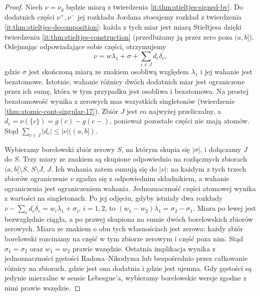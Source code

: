 \begin{proof}
Niech $\nu=\nu_g$ będzie miarą z twierdzenia
\ref{it:thm:stieltjes-signed-bv}. Do dodatnich części
$\nu^+,\nu^-$ jej rozkładu Jordana stosujemy rozkład
z twierdzenia \ref{it:thm:stieltjes-decomposition}:
każda z tych miar jest miarą Stieltjesa dzięki twierdzeniu
\ref{it:thm:stieltjes-construction} (przedłużamy ją przez
zero poza $(a,b]$). Odejmując odpowiadające sobie części,
otrzymujemy
\[
 \nu=w\lambda_1+\sigma+\sum_{c\in J}d_c\delta_c,
\]
gdzie $\sigma$ jest skończoną miarą ze znakiem osobliwą
względem $\lambda_1$ i jej wahanie jest bezatomowe.
Istotnie, wahanie różnicy dwóch dodatnich miar jest
ograniczone przez ich sumę, która w tym przypadku
jest osobliwa i bezatomowa. Na prostej bezatomowość
wynika z zerowych mas wszystkich singletonów
(twierdzenie \ref{thm:atomic-cont-singular-17}).
Zbiór $J$ jest co najwyżej przeliczalny, a
$d_c=\nu(\{c\})=g(c)-g(c-)$, ponieważ pozostałe
części nie mają atomów. Stąd
$\sum_{c\in J}|d_c|\le|\nu|((a,b])$.

Wybieramy borelowski zbiór zerowy $S$, na którym skupia się
$|\sigma|$, i dołączamy $J$ do $S$. Trzy miary ze znakiem
są skupione odpowiednio na rozłącznych zbiorach
$(a,b]\setminus S$, $S\setminus J$, $J$.
Ich wahania zatem sumują się do $|\nu|$:
na każdym z tych trzech zbiorów ograniczenie $\nu$
zgadza się z odpowiednim składnikiem, a wahanie
ograniczenia jest ograniczeniem wahania.
Jednoznaczność części atomowej wynika z wartości na
singletonach. Po jej odjęciu, gdyby istniały dwa rozkłady
$\nu-\sum_c d_c\delta_c=w_i\lambda_1+\sigma_i$,
$i=1,2$, to $(w_1-w_2)\lambda_1=\sigma_2-\sigma_1$.
Miara po lewej jest bezwzględnie ciągła, a po prawej
skupiona na sumie dwóch borelowskich zbiorów zerowych.
Miara ze znakiem o obu tych własnościach jest zerowa:
każdy zbiór borelowski rozcinamy na część w tym zbiorze
zerowym i część poza nim. Stąd $\sigma_1=\sigma_2$ oraz $w_1=w_2$ prawie
wszędzie. Ostatnia implikacja wynika z jednoznaczności
gęstości Radona--Nikodyma lub bezpośrednio przez
całkowanie różnicy na zbiorach, gdzie jest ona dodatnia
i gdzie jest ujemna. Gdy gęstości są jedynie mierzalne
w sensie Lebesgue'a, wybieramy borelowskie wersje
zgodne z nimi prawie wszędzie.


\end{proof}
